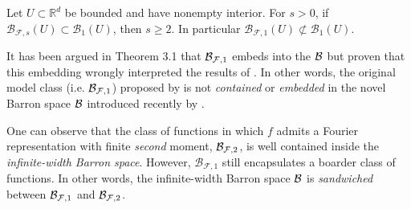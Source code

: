 \begin{proposition}

    Let $U \subset \mathbb{R}^d$ be bounded and have nonempty interior. For
    $s>0$, if $\mathcal{B}_{\mathcal{F},s}(U) \subset \mathcal{B}_{1}(U)$, then
    $s \geq 2$. In particular $\mathcal{B}_{\mathcal{F},1}(U) \not\subset
    \mathcal{B}_{1}(U)$.
\end{proposition}

\begin{remark}

    It has been argued in Theorem 3.1 \cite[p.
    12]{eRepresentationFormulasPointwise2020} that $\mathcal{B}_{\mathcal{F},1}$ embeds
    into the $\mathcal{B}$ but \cite{carageaNeuralNetworkApproximation2022} proven
    that this embedding wrongly interpreted the results of
    \cite{barronUniversalApproximationBounds1993,barronNeuralNetApproximation1992}.
    In other words, the original model class (i.e. $\mathcal{B}_{\mathcal{F},1}$)
    proposed by \cite{barronNeuralNetApproximation1992} is not
    \textit{contained} or \textit{embedded} in the novel Barron space $\mathcal{B}$
    introduced recently by \cite{eBarronSpaceFlowinduced2021}. 
    

    One can observe that the class of functions in which $f$ admits a Fourier
    representation with finite \textit{second} moment, $\mathcal{B}_{\mathcal{F}, 2}$,
    is well contained inside the \textit{infinite-width Barron space}. However,
    $\mathcal{B}_{\mathcal{F}, 1}$ still encapsulates a boarder class of
    functions. In other words, the infinite-width Barron space $\mathcal{B}$ is
    \textit{sandwiched} between $\mathcal{B}_{\mathcal{F}, 1}$ and $\mathcal{B}_{\mathcal{F},
    2}$.
\end{remark}


